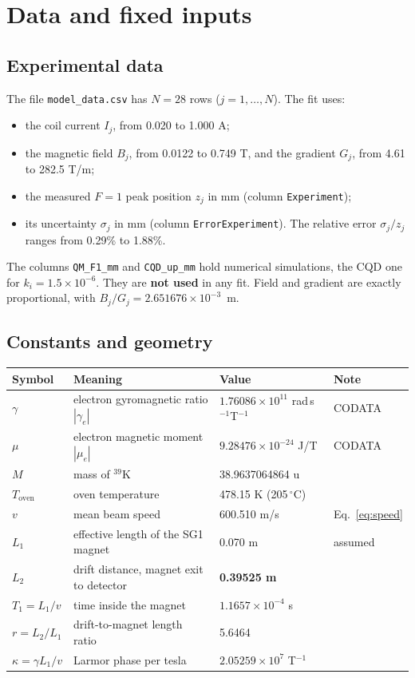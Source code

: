 \documentclass[11pt,a4paper]{article}
\begin{document}
\section{Data and fixed inputs}

\subsection{Experimental data}
The file \texttt{model\_data.csv} has $N=28$ rows ($j = 1,\dots,N$). The fit uses:
\begin{itemize}
\item the coil current $I_j$, from 0.020 to 1.000 A;
\item the magnetic field $B_j$, from 0.0122 to 0.749 T, and the gradient $G_j$, from 4.61 to 282.5 T/m;
\item the measured $F=1$ peak position $z_j$ in mm (column \texttt{Experiment});
\item its uncertainty $\sigma_j$ in mm (column \texttt{ErrorExperiment}). The relative error $\sigma_j/z_j$ ranges from 0.29\% to 1.88\%.
\end{itemize}
The columns \texttt{QM\_F1\_mm} and \texttt{CQD\_up\_mm} hold numerical simulations, the CQD one for $k_i=1.5\times10^{-6}$. They are \textbf{not used} in any fit. Field and gradient are exactly proportional, with $B_j/G_j = 2.651676\times10^{-3}$~m.

\subsection{Constants and geometry}
\begin{center}
\small
\begin{tabular}{llll}
\toprule
Symbol & Meaning & Value & Note\\
\midrule
$\gamma$ & electron gyromagnetic ratio $|\gamma_e|$ & $1.76086\times10^{11}$ rad\,s$^{-1}$T$^{-1}$ & CODATA\\
$\mu$    & electron magnetic moment $|\mu_e|$ & $9.28476\times10^{-24}$ J/T & CODATA\\
$M$      & mass of $^{39}$K & 38.9637064864 u & \\
$T_\text{oven}$ & oven temperature & 478.15 K (205\,$^\circ$C) & \\
$v$      & mean beam speed & 600.510 m/s & Eq.~\eqref{eq:speed}\\
$L_1$    & effective length of the SG1 magnet & 0.070 m & assumed\\
$L_2$    & drift distance, magnet exit to detector & \textbf{0.39525 m} & \\
\midrule
$T_1 = L_1/v$ & time inside the magnet & $1.1657\times10^{-4}$ s & \\
$r = L_2/L_1$ & drift-to-magnet length ratio & 5.6464 & \\
$\kappa = \gamma L_1/v$ & Larmor phase per tesla & $2.05259\times10^{7}$ T$^{-1}$ & \\
\bottomrule
\end{tabular}
\end{center}
\end{document}
